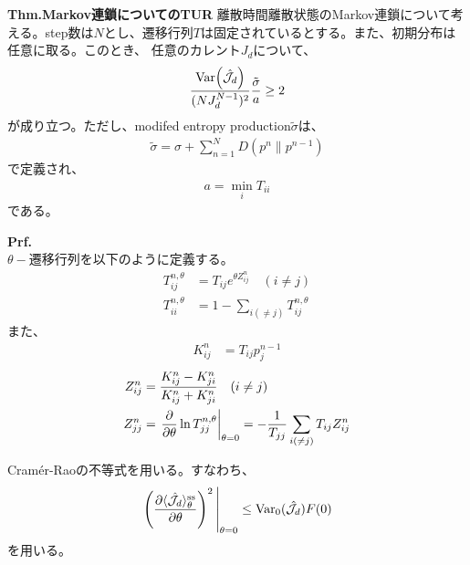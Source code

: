 \documentclass[a4paper,11pt]{jsarticle}
\numberwithin{equation}{section}
\begin{document}
\begin{itembox}[l]{\textbf{Thm.Markov連鎖についてのTUR}}
    離散時間離散状態のMarkov連鎖について考える。step数は$N$とし、遷移行列$T$は固定されているとする。また、初期分布は任意に取る。このとき、
    任意のカレント$J_{d}$について、
    \begin{align}
        \frac{\text{Var}\qty({\hat{\mathcal{J}_{d}}})}{(NJ_{d}^{N-1})^2} \frac{\tilde{\sigma}}{a} \geq 2    
    \end{align}
    が成り立つ。ただし、modifed entropy production$\tilde{\sigma}$は、
    \begin{align}
        \tilde{\sigma} = \sigma + \sum_{n=1}^{N} D(p^n \| p^{n-1})
    \end{align}
    で定義され、
    \begin{align}
        a = \min_{i} T_{ii}
    \end{align}
    である。
\end{itembox}
\textbf{Prf.}\\
$\theta-$遷移行列を以下のように定義する。
\begin{align}
    T_{ij}^{n,\theta} &= T_{ij}e^{\theta Z_{ij}^n} \quad (i \neq j)\\
    T_{ii}^{n,\theta} &= 1 - \sum_{i(\neq j)} T_{ij}^{n,\theta}
\end{align}
また、
\begin{align}
    K_{ij}^n &= T_{ij}p_j^{n-1} 
\end{align}
\begin{align}
    Z_{ij}^n &= \frac{K_{ij}^n - K_{ji}^n}{K_{ij}^n + K_{ji}^n} \quad (i \neq j)\\
    Z_{jj}^n &=\left.\pdv{\theta}\ln{T_{jj}^{n,\theta}}\right|_{\theta = 0} = -\frac{1}{T_{jj}}\sum_{i(\neq j)}T_{ij} Z_{ij}^n
\end{align}

Cram\'er-Raoの不等式を用いる。すなわち、
\begin{align}
    \eval{\left( \frac{\partial \langle {\hat{\mathcal{J}}_{d}} \rangle_\theta^{\text{ss}}}{\partial \theta} \right)^2}_{\theta = 0}
    \leq \mathrm{Var}_{0} (\hat{\mathcal{J}}_{d}) F(0) \label{eq:3}
    \end{align}
    を用いる。
\end{document}
